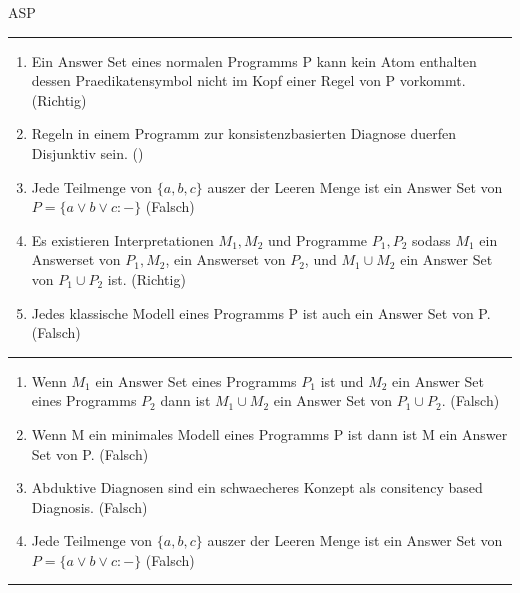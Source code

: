 \documentclass[a4paper,oneside,10pt,DIV12,headsepline,footexclude,headexclude]{scrartcl}
\begin{document}
\begin{section}{ASP}
    \rule{\textwidth}{1pt}
    \begin{enumerate}
    \item Ein Answer Set eines normalen Programms P kann kein Atom enthalten dessen Praedikatensymbol nicht im Kopf einer Regel von P vorkommt. (Richtig)
    \item Regeln in einem Programm zur konsistenzbasierten Diagnose duerfen Disjunktiv sein. ()
    \item Jede Teilmenge von $\{a,b,c\}$ auszer der Leeren Menge ist ein Answer Set von $ P = \{a \vee b \vee c :-\}$ (Falsch)
    \item Es existieren Interpretationen $M_1, M_2$ und Programme $P_1, P_2$ sodass $M_1$ ein Answerset von $P_1, M_2$, ein Answerset von $P_2$, und $M_1 \cup M_2$ ein Answer Set von $P_1 \cup P_2$ ist. (Richtig)
    \item Jedes klassische Modell eines Programms P ist auch ein Answer Set von P. (Falsch)
    \end{enumerate}
    \rule{\textwidth}{1pt}
    \begin{enumerate}
    \item Wenn $M_1$ ein Answer Set eines Programms $P_1$ ist und $M_2$ ein Answer Set eines Programms $P_2$ dann ist $M_1 \cup M_2$ ein Answer Set von $P_1 \cup P_2$. (Falsch)
    \item Wenn M ein minimales Modell eines Programms P ist dann ist M ein Answer Set von P. (Falsch)
    \item Abduktive Diagnosen sind ein schwaecheres Konzept als consitency based Diagnosis. (Falsch)
    \item Jede Teilmenge von $\{a,b,c\}$ auszer der Leeren Menge ist ein Answer Set von $ P = \{a \vee b \vee c :-\}$ (Falsch)
    \end{enumerate}

    \end{section}

    \rule{\textwidth}{1pt}
\end{document}
